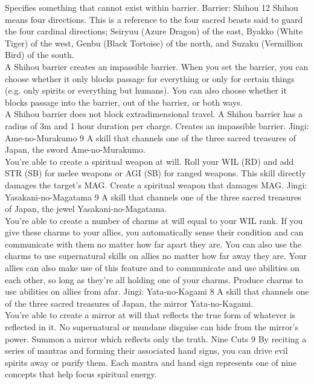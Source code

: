 \begin{path}
{Specifies something that cannot exist within barrier.}
\skilldescription
{Barrier: Shihou}
{12}
{Shihou means four directions. This is a reference to the four sacred beasts said to guard the four cardinal directions; Seiryuu (Azure Dragon) of the east, Byakko (White Tiger) of the west, Genbu (Black Tortoise) of the north, and Suzaku (Vermillion Bird) of the south.
\\A Shihou barrier creates an impassible barrier. When you set the barrier, you can choose whether it only blocks passage for everything or only for certain things (e.g. only spirits or everything but humans). You can also choose whether it blocks passage into the barrier, out of the barrier, or both ways.
\\A Shihou barrier does not block extradimensional travel. A Shihou barrier has a radius of 3m and 1 hour duration per charge.}
{Creates an impassible barrier.}
\skilldescription
{Jingi: Ame-no-Murakumo}
{9}
{A skill that channels one of the three sacred treasures of Japan, the sword Ame-no-Murakumo.
\\You're able to create a spiritual weapon at will. Roll your WIL (RD) and add STR (SB) for melee weapons or AGI (SB) for ranged weapons. This skill directly damages the target's MAG.}
{Create a spiritual weapon that damages MAG.}
\skilldescription
{Jingi: Yasakani-no-Magatama}
{9}
{A skill that channels one of the three sacred treasures of Japan, the jewel Yasakani-no-Magatama.
\\You're able to create a number of charms at will equal to your WIL rank. If you give these charms to your allies, you automatically sense their condition and can communicate with them no matter how far apart they are. You can also use the charms to use supernatural skills on allies no matter how far away they are. Your allies can also make use of this feature and to communicate and use abilities on each other, so long as they're all holding one of your charms.}
{Produce charms to use abilities on allies from afar.}
\skilldescription
{Jingi: Yata-no-Kagami}
{8}
{A skill that channels one of the three sacred treasures of Japan, the mirror Yata-no-Kagami.
\\You're able to create a mirror at will that reflects the true form of whatever is reflected in it. No supernatural or mundane disguise can hide from the mirror's power.}
{Summon a mirror which reflects only the truth.}
\skilldescription
{Nine Cuts}
{9}
{By reciting a series of mantras and forming their associated hand signs, you can drive evil spirits away or purify them. Each mantra and hand sign represents one of nine concepts that help focus spiritual energy.
}
\end{path}
